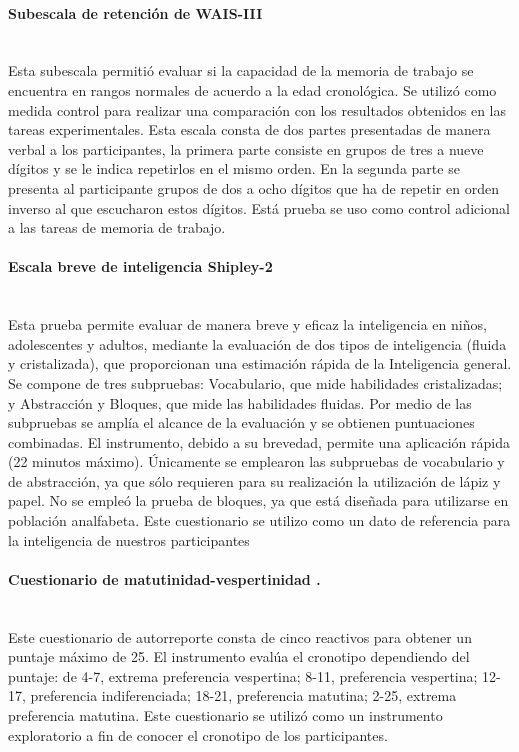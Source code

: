 \documentclass[12pt,letterpaper,final]{article}
\let\cite\cite %
\begin{document}
\paragraph[Subescala de retención de WAIS-III ]{Subescala de retención de WAIS-III \cite{WeschlerIII2004}} \mbox{}\\
Esta subescala permitió evaluar si la capacidad de la memoria de trabajo se encuentra en rangos normales de acuerdo a la edad cronológica. Se utilizó como medida control para realizar una comparación con los resultados obtenidos en las tareas experimentales. Esta escala consta de dos partes presentadas de manera verbal a los participantes, la primera parte consiste en grupos de tres a nueve dígitos y se le indica repetirlos en el mismo orden. En la segunda parte se presenta al participante grupos de dos a ocho dígitos que ha de repetir en orden inverso al que escucharon estos dígitos.
Está prueba se uso como control adicional a las tareas de memoria de trabajo.


\paragraph[Escala breve de inteligencia Shipley-2]{Escala breve de inteligencia Shipley-2 \cite{Shipley2014}} \mbox{}\\
Esta prueba permite evaluar de manera breve y eficaz la inteligencia en niños, adolescentes y adultos, mediante la evaluación de dos tipos de inteligencia (fluida y cristalizada), que proporcionan una estimación rápida de la Inteligencia general.
Se compone de tres subpruebas: Vocabulario, que mide habilidades cristalizadas; y Abstracción y Bloques, que mide las habilidades fluidas. Por medio de las subpruebas se amplía el alcance de la evaluación y se obtienen puntuaciones combinadas. El instrumento, debido a su brevedad, permite una aplicación rápida (22 minutos máximo). Únicamente se emplearon las subpruebas de vocabulario y de abstracción, ya que sólo requieren para su realización la utilización de lápiz y papel. No se empleó la prueba de bloques, ya que está diseñada para utilizarse en población analfabeta.
Este cuestionario se utilizo como un dato de referencia para la inteligencia de nuestros participantes

\paragraph[Cuestionario de matutinidad-vespertinidad%
]{Cuestionario de matutinidad-vespertinidad \cite{Horne1976}.} \mbox{}\\
Este cuestionario de autorreporte consta de cinco reactivos para obtener un puntaje máximo de 25. El instrumento evalúa el cronotipo dependiendo del puntaje: de 4-7, extrema preferencia vespertina; 8-11, preferencia vespertina; 12-17, preferencia indiferenciada; 18-21, preferencia matutina; 2-25, extrema preferencia matutina.
Este cuestionario se utilizó como un instrumento exploratorio a fin de conocer el cronotipo de los participantes.
\end{document}
